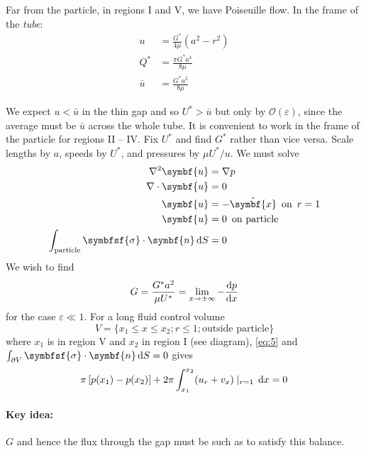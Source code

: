 \documentclass{jknotes}
\begin{document}
Far from the particle, in regions I and V, we have Poiseuille flow. In the
frame of the \emph{tube}:
\begin{align}
	u &= \frac{G^*}{4\mu} (a^2 - r^2) \\
	Q^* &= \frac{\pi G^* a^4}{8\mu} \\
	\bar{u} &= \frac{G^* a^2}{8\mu} 
\end{align}

We expect $u < \bar{u}$ in the thin gap and so $U^* > \bar{u}$ but only by
$\mathcal{O}(\varepsilon)$, since the average must be $\bar{u}$ across the
whole tube. It is convenient to work in the frame of the particle for regions
II -- IV. Fix $U^*$ and find $G^*$ rather than vice versa. Scale lengths by
$a$, speeds by $U^*$, and pressures by $\mu U^*/u$. We must solve
\begin{align}
	\nabla^2 \symbf{u} &= \nabla p\label{eq:1}\\
	\nabla \cdot \symbf{u} &= 0 \label{eq:2}\\
	\symbf{u} &= - \hat{\symbf{x}} \hspace{.5em} \text{on} \,\,\,
	r=1\label{eq:3} \\
	\symbf{u} &= 0 \hspace{.5em} \text{on particle} \label{eq:4}\\
	\int_{\text{particle}} \symbfsf{\sigma} \cdot \symbf{n} \, \diffd S &= 0
	\label{eq:5}
\end{align}
We wish to find
\begin{equation}
	G = \frac{G^* a^2}{\mu U^*} = \lim_{x \to \pm \infty} -\frac{\diffd
	p}{\diffd x}
\end{equation}
for the case $\varepsilon \ll 1$. For a long fluid control volume
\begin{equation}
	V = \{ x_1 \le x \le x_2; r\le 1; \text{outside particle}\}
\end{equation}
where $x_1$ is in region V and $x_2$ in region I (see diagram),  \eqref{eq:5}
and $\int_{\partial V} \symbfsf{\sigma}\cdot\symbf{n}\,\diffd S = 0$ gives
\begin{equation}
	\pi \left[ p(x_1) - p(x_2)\right] + 2\pi \int_{x_1}^{x_2} (u_r +
	v_x)\mid_{r=1} \, \diffd x = 0 \label{eq:fb}
\end{equation}

\paragraph{Key idea:} $G$ and hence the flux through the gap must be such as
to satisfy this balance.
\begin{center}
\end{center}
\end{document}
